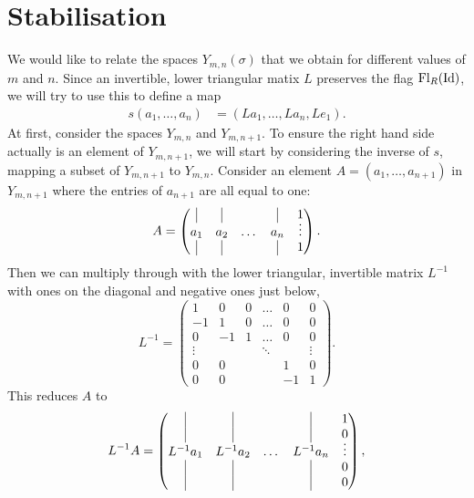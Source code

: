 \section{Stabilisation} 
\label{sec:rum-stabil}

We would like to relate the spaces $Y_{m,n}(\sigma)$ that we obtain
for different values of
$m$ and $n$. Since an invertible, lower triangular matix $L$ preserves
the flag $\mathrm{Fl}_R(\operatorname{Id})$, we will try to use this to define a map
\begin{align*}
  s(a_1,\dots,a_{n}) &= (La_1,\dots,La_{n},Le_1).
\end{align*}
At first, consider the spaces $Y_{m,n}$ and $Y_{m,n+1}$.
To ensure the right hand side actually is an element of $Y_{m,n+1}$,
we will start by considering the inverse of $s$, mapping a subset of
$Y_{m,n+1}$ to $Y_{m,n}$.
Consider an element $A=(a_1,\dots,a_{n+1})$ in $Y_{m,n+1}$ where
the entries of $a_{n+1}$ are all equal to one:
\[ A = 
  \begin{pmatrix}
    \vrule & \vrule & & \vrule & \vspace{-0.5em}
                                 1 \\
    a_1 & a_2 & \dots & a_{n} & \vdots \\
    \vrule & \vrule & & \vrule & 1
  \end{pmatrix}. \] 
Then we can multiply through with the lower triangular, invertible
matrix $L^{-1}$ with ones on the diagonal and negative ones just below,
\[ L^{-1} =
\begin{pmatrix}
   1 &  0 & 0 & \dots & 0 & 0 \\
  -1 &  1 & 0 & \dots & 0 &0 \\
   0 & -1 & 1 & \dots & 0 & 0 \\
   \vdots &  &  & \ddots & & \vdots \\
   0 & 0 & & & 1 & 0 \\
   0 & 0 & & & -1 & 1
\end{pmatrix}. \]
This reduces $A$ to
\[ L^{-1}A =
\begin{pmatrix}
  \vrule & \vrule & & \vrule & 
  1 \\
  \vrule & \vrule & & \vrule & \vspace{-0.5em}
  0 \\
  L^{-1}a_1 & L^{-1}a_2 & \dots & L^{-1}a_{n} & \vdots \\
  \vrule & \vrule & & \vrule & 0 \\
  \vrule & \vrule & & \vrule & 0
\end{pmatrix}, \]
